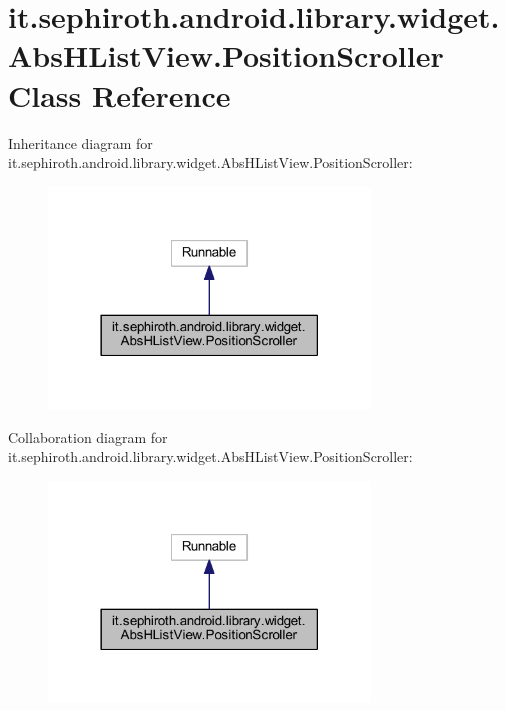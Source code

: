 \hypertarget{classit_1_1sephiroth_1_1android_1_1library_1_1widget_1_1_abs_h_list_view_1_1_position_scroller}{}\section{it.\+sephiroth.\+android.\+library.\+widget.\+Abs\+H\+List\+View.\+Position\+Scroller Class Reference}
\label{classit_1_1sephiroth_1_1android_1_1library_1_1widget_1_1_abs_h_list_view_1_1_position_scroller}


Inheritance diagram for it.\+sephiroth.\+android.\+library.\+widget.\+Abs\+H\+List\+View.\+Position\+Scroller\+:
\nopagebreak
\begin{figure}[H]
\begin{center}
\leavevmode
\includegraphics[width=242pt]{classit_1_1sephiroth_1_1android_1_1library_1_1widget_1_1_abs_h_list_view_1_1_position_scroller__inherit__graph}
\end{center}
\end{figure}


Collaboration diagram for it.\+sephiroth.\+android.\+library.\+widget.\+Abs\+H\+List\+View.\+Position\+Scroller\+:
\nopagebreak
\begin{figure}[H]
\begin{center}
\leavevmode
\includegraphics[width=242pt]{classit_1_1sephiroth_1_1android_1_1library_1_1widget_1_1_abs_h_list_view_1_1_position_scroller__coll__graph}
\end{center}
\end{figure}
